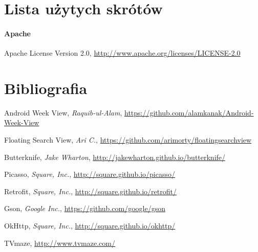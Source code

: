 \documentclass[10pt,a4paper]{article}
\begin{document}
\section{Lista użytych skrótów}
\label{abbr:lic}
\paragraph{Apache} Apache License Version 2.0, \url{http://www.apache.org/licenses/LICENSE-2.0}

\renewcommand*{\refname}{\vspace*{-2em}}
\section{Bibliografia}
\begin{thebibliography}{99}

Android Week View,
\emph{Raquib-ul-Alam},
\url{https://github.com/alamkanak/Android-Week-View}

Floating Search View,
\emph{Ari C.},
\url{https://github.com/arimorty/floatingsearchview}

Butterknife,
\emph{Jake Wharton},
\url{http://jakewharton.github.io/butterknife/}

Picasso,
\emph{Square, Inc.},
\url{http://square.github.io/picasso/}

Retrofit,
\emph{Square, Inc.},
\url{http://square.github.io/retrofit/}

Gson,
\emph{Google Inc.},
\url{https://github.com/google/gson}

OkHttp,
\emph{Square, Inc.},
\url{http://square.github.io/okhttp/}

TVmaze,
\url{http://www.tvmaze.com/}

\end{thebibliography}
\end{document}
